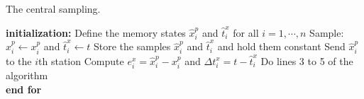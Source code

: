 \begin{algorithm}
\small
\caption{The central sampling.}\label{CentralAlgorithm}
\begin{algorithmic}[1]
\Statex\textbf{initialization:}
\State Define the memory states $\hat{x}_i^p$ and $\hat{t}_i^{x}$ for all $i=1,\cdots,n$
\State Sample: $\hat{x}_i^p\gets x_i^p$ and $\hat{t}_i^{x}\gets t$
\State Store the samples $\hat{x}_i^p$ and $\hat{t}_{i}^{x}$ and hold them constant
\State Send $\hat{x}_i^p$ to the $i$th station
\EndFor
{}
\State Compute $e_i^{x}=\hat{x}_i^p-x_i^p$ and $\Delta t_i^{x}= t - \hat{t}_{i}^{x}$
\State Do lines 3 to 5 of the algorithm
\EndIf
\\\textbf{end for}
\EndWhile
\end{algorithmic}
\end{algorithm}
